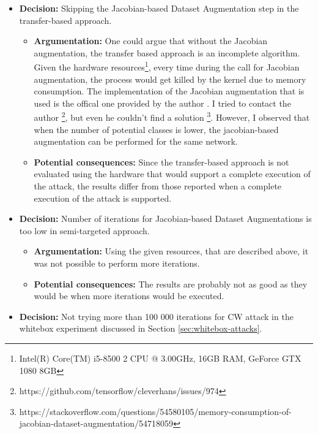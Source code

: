 \begin{itemize}

	\item \textbf{Decision:} Skipping the Jacobian-based Dataset Augmentation step in the transfer-based approach.

		\begin{itemize}	
			\item \textbf{Argumentation:} One could argue that without the Jacobian augmentation, the transfer based approach is an incomplete algorithm. Given the hardware resources\footnote{Intel(R) Core(TM) i5-8500 2 CPU @ 3.00GHz, 16GB RAM, GeForce GTX 1080 8GB}, every time during the call for Jacobian augmentation, the process would get killed by the kernel due to memory consumption. The implementation of the Jacobian augmentation that is used is the offical one provided by the author \cite{papernot2018cleverhans}. I tried to contact the author \footnote{https://github.com/tensorflow/cleverhans/issues/974}, but even he couldn't find a solution \footnote{https://stackoverflow.com/questions/54580105/memory-consumption-of-jacobian-dataset-augmentation/54718059}. However, I observed that when the number of potential classes is lower, the jacobian-based augmentation can be performed for the same network.
	
			\item \textbf{Potential consequences:} Since the transfer-based approach is not evaluated using the hardware that would support a complete execution of the attack, the results differ from those reported when a complete execution of the attack is supported.
		\end{itemize}
	
	\item \textbf{Decision:} Number of iterations for Jacobian-based Dataset Augmentations is too low in semi-targeted approach.

		\begin{itemize}
			\item \textbf{Argumentation:} Using the given resources, that are described above, it was not possible to perform more iterations.
	
			\item \textbf{Potential consequences:} The results are probably not as good as they would be when more iterations would be executed.
		\end{itemize}
	
	\item \textbf{Decision:} 
Not trying more than 100 000 iterations for CW attack in the whitebox experiment discussed in Section \ref{sec:whitebox-attacks}.


\end{itemize}
